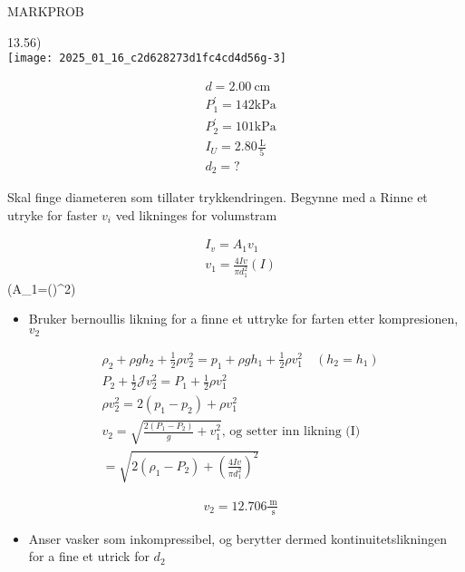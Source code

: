 \documentclass[10pt]{article}
\begin{document}
MARKPROB

13.56)\\

\texttt{[image: 2025\_01\_16\_c2d628273d1fc4cd4d56g-3]}

$$
\begin{aligned}
& d=2.00 \mathrm{~cm} \\
& P_{1}^{\prime}=142 \mathrm{kPa} \\
& P_{2}^{\prime}=101 \mathrm{kPa} \\
& I_{U}=2.80 \frac{\mathrm{~L}}{5} \\
& d_{2}=?
\end{aligned}
$$

Skal finge diameteren som tillater trykkendringen. Begynne med a Rinne et utryke for faster $v_{i}$ ved likninges for volumstram


\begin{align*}
& I_{v}=A_{1} v_{1} \\
& v_{1}=\frac{4 I v}{\pi d_{1}^{2}}(I) \tag{I}
\end{align*}\left(A_{1}=\pi\left(\right)^{2}\right)


\begin{itemize}
  \item Bruker bernoullis likning for a finne et uttryke for farten etter kompresionen, $v_{2}$
\end{itemize}

$$
\begin{aligned}
& \rho_{2}+\rho g h_{2}+\frac{1}{2} \rho v_{2}^{2}=p_{1}+\rho g h_{1}+\frac{1}{2} \rho v_{1}^{2} \quad\left(h_{2}=h_{1}\right) \\
& P_{2}+\frac{1}{2} \mathcal{J} v_{2}^{2}=P_{1}+\frac{1}{2} \rho v_{1}^{2} \\
& \rho v_{2}^{2}=2\left(p_{1}-p_{2}\right)+\rho v_{1}^{2} \\
& v_{2}=\sqrt{\frac{2\left(P_{1}-P_{2}\right)}{g}+v_{1}^{2}} \text {, og setter inn likning (I) } \\
& =\sqrt{2\left(\rho_{1}-P_{2}\right)+\left(\frac{4 I v}{\pi d_{1}^{2}}\right)^{2}}
\end{aligned}
$$

$$
\begin{aligned}
& v_{2}=12.706 \frac{\mathrm{~m}}{\mathrm{~s}}
\end{aligned}
$$

\begin{itemize}
  \item Anser vasker som inkompressibel, og berytter dermed kontinuitetslikningen for a fine et utrick for $d_{2}$
\end{itemize}
\end{document}
